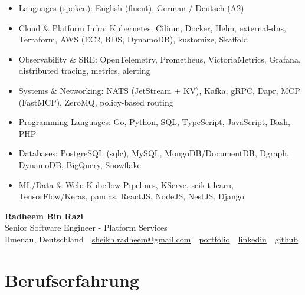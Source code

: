 \documentclass[10pt,a4paper]{resume}
\makeatletter
\newcommand{\Portfolio}{https://radheem.github.io/my-cv}
\newcommand{\PortfolioText}{portfolio}
\newcommand{\GitHub}{https://github.com/radheem}
\newcommand{\LinkedIn}{https://www.linkedin.com/in/radheem-razi}
\newcommand{\Email}{sheikh.radheem@gmail.com}
\makeatother
\begin{document}
\begin{itemize}[leftmargin=1.4em,nosep,topsep=2pt]
  \item Languages (spoken): English (fluent), German / Deutsch (A2)
  \item Cloud \& Platform Infra: Kubernetes, Cilium, Docker, Helm, external-dns, Terraform, AWS (EC2, RDS, DynamoDB), kustomize, Skaffold
  \item Observability \& SRE: OpenTelemetry, Prometheus, VictoriaMetrics, Grafana, distributed tracing, metrics, alerting
  \item Systems \& Networking: NATS (JetStream + KV), Kafka, gRPC, Dapr, MCP (FastMCP), ZeroMQ, policy-based routing
  \item Programming Languages: Go, Python, SQL, TypeScript, JavaScript, Bash, PHP
  \item Databases: PostgreSQL (sqlc), MySQL, MongoDB/DocumentDB, Dgraph, DynamoDB, BigQuery, Snowflake
  \item ML/Data \& Web: Kubeflow Pipelines, KServe, scikit-learn, TensorFlow/Keras, pandas, ReactJS, NodeJS, NestJS, Django
\end{itemize}

\clearpage
{}

\begin{center}
  {\huge\bfseries Radheem Bin Razi}\\[3pt]
  {\large Senior Software Engineer - Platform Services}\\[6pt]
  \small
  Ilmenau, Deutschland \,\textbar\,
  \href{mailto:\Email}{\Email} \,\textbar\,
  \href{\Portfolio}{\PortfolioText} \,\textbar\,
  \href{\LinkedIn}{linkedin} \,\textbar\,
  \href{\GitHub}{github}
\end{center}
\vspace{2pt}

\section{Berufserfahrung}
\end{document}
